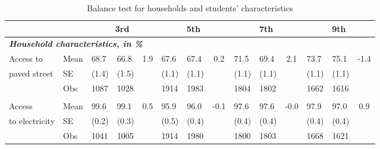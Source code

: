 \documentclass[
	article,			%
	12pt,				%
	oneside,			%
	a4paper,			%
	]{article}
\begin{document}
\begin{table}[h!]
\centering
\fontsize{8}{11} \selectfont
\caption{Balance test for households and students' characteristics}
    \begin{tabular}{lp{2.335em}p{1.665em}p{1.665em}cp{1.665em}p{1.665em}cp{1.665em}p{1.665em}cp{1.665em}p{1.665em}c}
 \hline
\hline
           &            &             \multicolumn{ 3}{c}{3rd} &             \multicolumn{ 3}{c}{5th} &             \multicolumn{ 3}{c}{7th} &             \multicolumn{ 3}{c}{9th} \\
\hline
                                                                                                                 \multicolumn{ 14}{l}{{\it {\bf Household characteristics, in \%}}} \\

Access to  &       Mean &       68.7 &       66.8 &        1.9 &       67.6 &       67.4 &        0.2 &       71.5 &       69.4 &        2.1 &       73.7 &       75.1 &       -1.4 \\

paved street &         SE &      (1.4) &      (1.5) &            &      (1.1) &      (1.1) &            &      (1.1) &      (1.1) &            &      (1.1) &      (1.1) &            \\

           &        Obs &       1087 &       1028 &            &       1914 &       1983 &            &       1804 &       1802 &            &       1662 &       1616 &            \\

           &            &            &            &            &            &            &            &            &            &            &            &            &            \\

   Access  &       Mean &       99.6 &       99.1 &        0.5 &       95.9 &       96.0 &       -0.1 &       97.6 &       97.6 &       -0.0 &       97.9 &       97.0 &        0.9 \\

to electricity &         SE &      (0.2) &      (0.3) &            &      (0.5) &      (0.4) &            &      (0.4) &      (0.4) &            &      (0.4) &      (0.4) &            \\

           &        Obs &       1041 &       1005 &            &       1914 &       1980 &            &       1800 &       1803 &            &       1668 &       1621 &            \\


\end{tabular}
\end{table}
\end{document}
